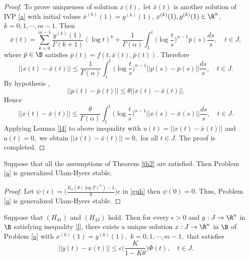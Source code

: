 \begin{proof}
To prove uniqueness of solution $x(t),$ let $\bar{x}(t)$ is another solution of IVP \eqref{a} with initial values $\bar{x}^{(k)}(1)=y^{(k)}(1)$, $x^{(k)}(1),y^{(k)}(1)\in{\R}^{n}$, $k=0,1,\cdots,m-1.$ Then
\begin{equation*}
\bar{x}(t)=\sum_{k=0}^{m-1}\frac{y^{(k)}(1)}{\Gamma(k+1)}(\log{t})^k+\frac{1}{\Gamma(\alpha)}\int_{1}^{t}\bigg(\log{\frac{t}{s}}\bigg)^{\alpha-1}\bar{p}(s)\frac{ds}{s},\quad t\in{J},
\end{equation*}
where $\bar{p}\in\B$ satisfies $\bar{p}(t)=f(t,\bar{x}(t),\bar{p}(t)).$ Therefore
\begin{equation*}
||x(t)-\bar{x}(t)||\leq\frac{1}{\Gamma(\alpha)}\int_{1}^{t}\bigg(\log{\frac{t}{s}}\bigg)^{\alpha-1}||p(s)-\bar{p}(s)||\frac{ds}{s},\quad t\in{J}.
\end{equation*}
By hypothesis ,
\begin{equation*}
||p(t)-\bar{p}(t)||\leq\theta||x(t)-\bar{x}(t)||.
\end{equation*}
Hence
\begin{equation*}
||x(t)-\bar{x}(t)||\leq\frac{\theta}{\Gamma(\alpha)}\int_{1}^{t}\bigg(\log{\frac{t}{s}}\bigg)^{\alpha-1}||x(s)-\bar{x}(s)||\frac{ds}{s},\quad t\in{J}.
\end{equation*}
Applying Lemma \ref{l4} to above inequality with $u(t)=||x(t)-\bar{x}(t)||$ and $a(t)=0,$ we obtain $||x(t)-\bar{x}(t)||=0,$
for all $t\in{J}.$ The proof is completed.
\end{proof}
\begin{cor}
Suppose that all the assumptions of Theorem \ref{th2} are satisfied. Then Problem \eqref{a} is generalized Ulam-Hyers stable.
\end{cor}
\begin{proof}
Let $\psi(\epsilon)=\big(\frac{E_\alpha(\theta(\log{T})^{\alpha})-1}{\theta}\big)\epsilon$ in \eqref{guh} then $\psi(0)=0.$ Thus, Problem \eqref{a} is generalized Ulam-Hyers stable.
\end{proof}
\begin{theorem}
Suppose that $(H_{41})$ and $(H_{42})$ hold. Then for every $\epsilon>0$ and $y:{J}\to{\R}^n$ in $\B$ satisfying inequality \eqref{l}, there exists a unique solution $x:{J}\to{\R}^{n}$ in $\B$ of Problem \eqref{a} with $x^{(k)}(1)=y^{(k)}(1),\,\, k=0,1,\cdots,m-1,$ that satisfies
\begin{equation*}
||y(t)-x(t)||\leq\epsilon\bigg(\frac{K}{1-K\theta}\bigg)\Phi(t),\quad t\in{J}.
\end{equation*}
\end{theorem}
